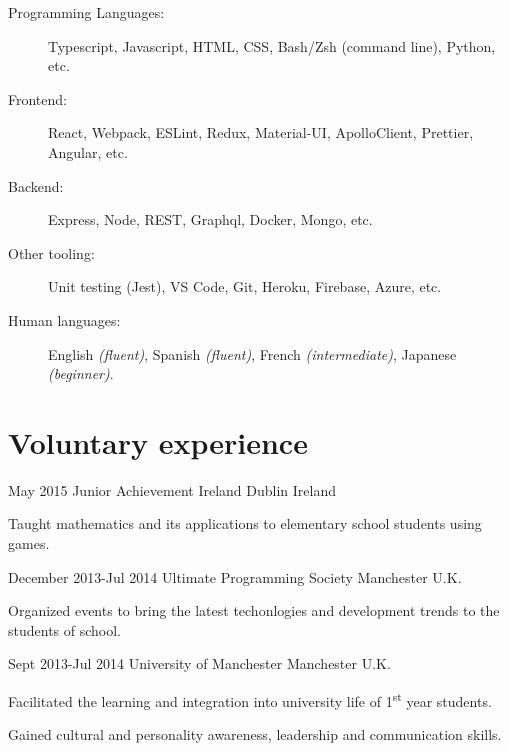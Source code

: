 \documentclass[10pt]{CurriculumVitae}
\begin{document}
    \begin{description}
      \item[Programming Languages:] Typescript, Javascript, HTML, CSS, Bash/Zsh (command line), Python, etc.
      \item[Frontend:] React, Webpack, ESLint, Redux, Material-UI, ApolloClient, Prettier, Angular, etc.
      \item[Backend:] Express, Node, REST, Graphql, Docker, Mongo, etc. 
      \item[Other tooling:] Unit testing (Jest), VS Code, Git, Heroku, Firebase, Azure, etc.
      \item[Human languages:] English \emph{(fluent)}, Spanish \emph{(fluent)}, French \emph{(intermediate)}, Japanese \emph{(beginner)}.
    \end{description}


  \section{Voluntary experience}
     
      {May 2015}
      {Junior Achievement Ireland}
      {Dublin}
      {Ireland}
      {
         \item Taught mathematics and its applications to elementary school students using games.
      }

      {December 2013-Jul 2014}
      {Ultimate Programming Society}
      {Manchester}
      {U.K.}
      {
         \item Organized events to bring the latest techonlogies and development trends to the students of school.
      }

      {Sept 2013-Jul 2014}
      {University of Manchester}
      {Manchester}
      {U.K.}
      {
         \item Facilitated the learning and integration into university life of 1\textsuperscript{st} year students.
         \item Gained cultural and personality awareness, leadership and communication skills.
      }
\end{document}
